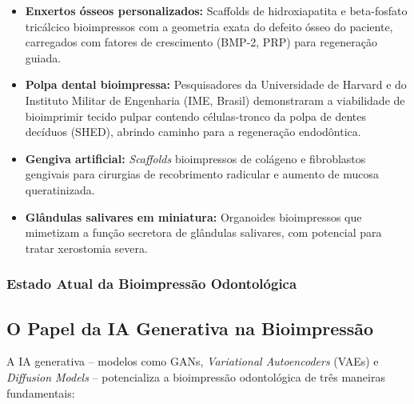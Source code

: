 \begin{itemize}
  \item \textbf{Enxertos ósseos personalizados:} Scaffolds de hidroxiapatita e
    beta-fosfato tricálcico bioimpressos com a geometria exata do defeito ósseo
    do paciente, carregados com fatores de crescimento (BMP-2, PRP) para
    regeneração guiada.

  \item \textbf{Polpa dental bioimpressa:} Pesquisadores da Universidade de
    Harvard e do Instituto Militar de Engenharia (IME, Brasil) demonstraram a
    viabilidade de bioimprimir tecido pulpar contendo células-tronco da polpa
    de dentes decíduos (SHED), abrindo caminho para a regeneração endodôntica.

  \item \textbf{Gengiva artificial:} \textit{Scaffolds} bioimpressos de
    colágeno e fibroblastos gengivais para cirurgias de recobrimento radicular
    e aumento de mucosa queratinizada.

  \item \textbf{Glândulas salivares em miniatura:} Organoides bioimpressos que
    mimetizam a função secretora de glândulas salivares, com potencial para
    tratar xerostomia severa.
\end{itemize}

\subsubsection{Estado Atual da Bioimpressão Odontológica}

\subsection{O Papel da IA Generativa na Bioimpressão}

A IA generativa -- modelos como GANs, \textit{Variational Autoencoders} (VAEs)
e \textit{Diffusion Models} -- potencializa a bioimpressão odontológica de três
maneiras fundamentais:

